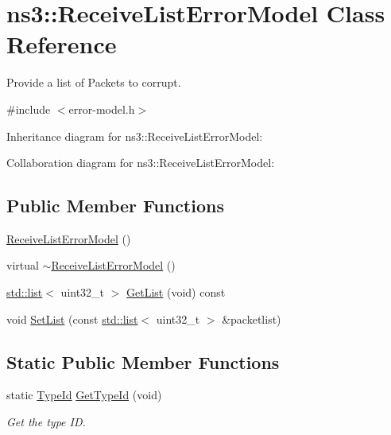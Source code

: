 \hypertarget{classns3_1_1ReceiveListErrorModel}{}\section{ns3\+:\+:Receive\+List\+Error\+Model Class Reference}
\label{classns3_1_1ReceiveListErrorModel}


Provide a list of Packets to corrupt.  




{\ttfamily \#include $<$error-\/model.\+h$>$}



Inheritance diagram for ns3\+:\+:Receive\+List\+Error\+Model\+:


Collaboration diagram for ns3\+:\+:Receive\+List\+Error\+Model\+:
\subsection*{Public Member Functions}
\begin{DoxyCompactItemize}
\item 
\hyperlink{classns3_1_1ReceiveListErrorModel_a3e6f597b6c4b891788540763563be65d}{Receive\+List\+Error\+Model} ()
\item 
virtual \hyperlink{classns3_1_1ReceiveListErrorModel_a2b2efa830cf6928cfbc27ba218812357}{$\sim$\+Receive\+List\+Error\+Model} ()
\item 
\hyperlink{openflow-interface_8h_afd9bcfa176617760671b67580f536fa7}{std\+::list}$<$ uint32\+\_\+t $>$ \hyperlink{classns3_1_1ReceiveListErrorModel_a36ac42920f862b28d520c19ccec4f9ef}{Get\+List} (void) const 
\item 
void \hyperlink{classns3_1_1ReceiveListErrorModel_ae710ec96d43c47bedb5d941351a4d809}{Set\+List} (const \hyperlink{openflow-interface_8h_afd9bcfa176617760671b67580f536fa7}{std\+::list}$<$ uint32\+\_\+t $>$ \&packetlist)
\end{DoxyCompactItemize}
\subsection*{Static Public Member Functions}
\begin{DoxyCompactItemize}
\item 
static \hyperlink{classns3_1_1TypeId}{Type\+Id} \hyperlink{classns3_1_1ReceiveListErrorModel_a42fa26ce67a8f93a1bb330393dc43cf3}{Get\+Type\+Id} (void)
\begin{DoxyCompactList}\small\item\em Get the type ID. \end{DoxyCompactList}\end{DoxyCompactItemize}
